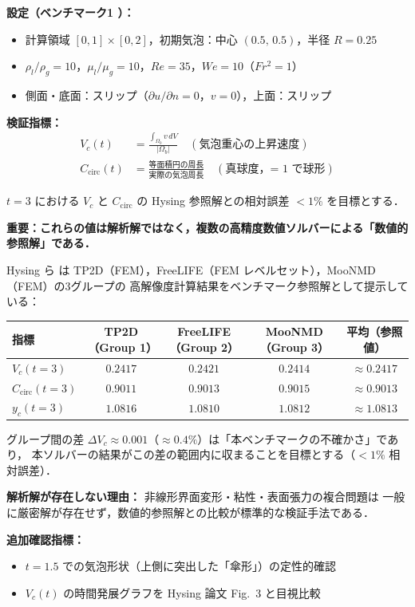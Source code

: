 \textbf{設定（ベンチマーク1 \cite{Hysing2009}）：}
\begin{itemize}
  \item 計算領域 $[0, 1] \times [0, 2]$，初期気泡：中心 $(0.5,\,0.5)$，半径 $R = 0.25$
  \item $\rho_l / \rho_g = 10$，$\mu_l / \mu_g = 10$，$Re = 35$，$We = 10$（$Fr^2 = 1$）
  \item 側面・底面：スリップ（$\partial u/\partial n = 0$，$v = 0$），上面：スリップ
\end{itemize}

\textbf{検証指標：}
\begin{align}
  V_c(t) &= \frac{\int_{\Omega_b} v \, dV}{|\Omega_b|}
  \quad (\text{気泡重心の上昇速度}) \label{eq:bubble_vc} \\
  C_{\mathrm{circ}}(t) &= \frac{\text{等面積円の周長}}{\text{実際の気泡周長}}
  \quad (\text{真球度，= 1 で球形}) \label{eq:bubble_circ}
\end{align}

$t = 3$ における $V_c$ と $C_{\mathrm{circ}}$ の Hysing 参照解との相対誤差 $< 1\%$ を目標とする．

\begin{tcolorbox}[defbox, title={Hysing (2009) Test Case 1 の参照値（数値参照解）}]
\textbf{重要：これらの値は解析解ではなく，複数の高精度数値ソルバーによる「数値的参照解」である．}

Hysing ら \cite{Hysing2009} は TP2D（FEM），FreeLIFE（FEM レベルセット），MooNMD（FEM）の3グループの
高解像度計算結果をベンチマーク参照解として提示している：

\begin{center}
\renewcommand{\arraystretch}{1.3}
\begin{tabular}{lcccc}
\hline
指標 & TP2D（Group 1） & FreeLIFE（Group 2） & MooNMD（Group 3） & 平均（参照値） \\
\hline
$V_c(t=3)$ & $0.2417$ & $0.2421$ & $0.2414$ & $\approx 0.2417$ \\
$C_{\mathrm{circ}}(t=3)$ & $0.9011$ & $0.9013$ & $0.9015$ & $\approx 0.9013$ \\
$y_c(t=3)$ & $1.0816$ & $1.0810$ & $1.0812$ & $\approx 1.0813$ \\
\hline
\end{tabular}
\end{center}

グループ間の差 $\Delta V_c \approx 0.001$（$\approx 0.4\%$）は「本ベンチマークの不確かさ」であり，
本ソルバーの結果がこの差の範囲内に収まることを目標とする（$< 1\%$ 相対誤差）．

\textbf{解析解が存在しない理由：} 非線形界面変形・粘性・表面張力の複合問題は
一般に厳密解が存在せず，数値的参照解との比較が標準的な検証手法である．

\textbf{追加確認指標：}
\begin{itemize}
  \item $t = 1.5$ での気泡形状（上側に突出した「傘形」）の定性的確認
  \item $V_c(t)$ の時間発展グラフを Hysing 論文 Fig.~3 と目視比較
\end{itemize}
\end{tcolorbox}

